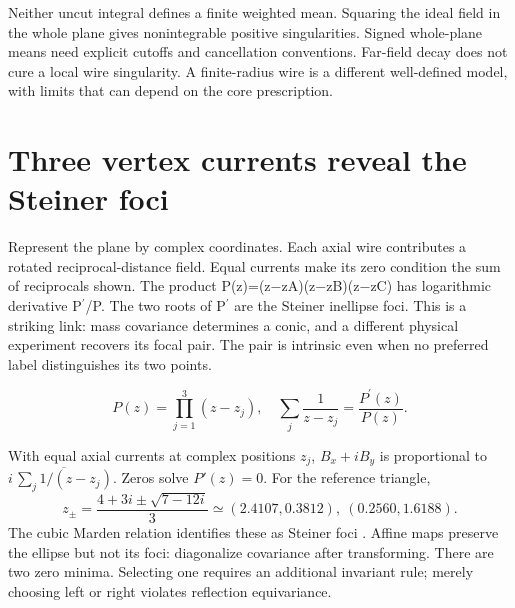\documentclass[11pt,oneside,openany]{book}
\begin{document}
Neither uncut integral defines a finite weighted mean. Squaring
the ideal field in the whole plane gives nonintegrable positive
singularities. Signed whole-plane means need explicit cutoffs and
cancellation conventions. Far-field decay does not cure a local
wire singularity. A finite-radius wire is a different well-defined
model, with limits that can depend on the core prescription.




\section{Three vertex currents reveal the Steiner foci}\label{sec:slide25}

Represent the plane by complex coordinates. Each axial wire contributes a rotated reciprocal-distance field. Equal currents make its zero condition the sum of reciprocals shown. The product P(z)=(z\ensuremath{-}zA)(z\ensuremath{-}zB)(z\ensuremath{-}zC) has logarithmic derivative P\ensuremath{^\prime}/P. The two roots of P\ensuremath{^\prime} are the Steiner inellipse foci. This is a striking link: mass covariance determines a conic, and a different physical experiment recovers its focal pair. The pair is intrinsic even when no preferred label distinguishes its two points.


\[P(z)=\prod_{j=1}^3(z-z_j),\quad\sum_j\frac1{z-z_j}=\frac{P^\prime(z)}{P(z)}.\]



With equal axial currents at complex positions $z_j$,
$B_x+iB_y$ is proportional to
$i\,\overline{\sum_j1/(z-z_j)}$. Zeros solve $P'(z)=0$.
For the reference triangle,
\[
z_\pm=\frac{4+3i\pm\sqrt{7-12i}}3
\simeq(2.4107,0.3812),\ (0.2560,1.6188).
\]
The cubic Marden relation identifies these as Steiner foci
\cite{marden}. Affine maps preserve the ellipse but not its foci:
diagonalize covariance after transforming.
There are two zero minima. Selecting one requires an additional
invariant rule; merely choosing left or right violates reflection
equivariance.
\end{document}
